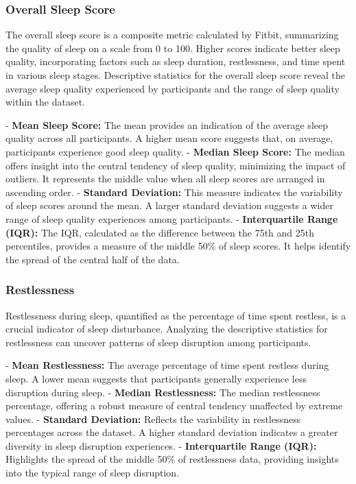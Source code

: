 \documentclass[10pt]{extarticle}
\begin{document}
\subsubsection{Overall Sleep Score}

The overall sleep score is a composite metric calculated by Fitbit, summarizing the quality of sleep on a scale from 0 to 100. Higher scores indicate better sleep quality, incorporating factors such as sleep duration, restlessness, and time spent in various sleep stages. Descriptive statistics for the overall sleep score reveal the average sleep quality experienced by participants and the range of sleep quality within the dataset.

- \textbf{Mean Sleep Score:} The mean provides an indication of the average sleep quality across all participants. A higher mean score suggests that, on average, participants experience good sleep quality.
- \textbf{Median Sleep Score:} The median offers insight into the central tendency of sleep quality, minimizing the impact of outliers. It represents the middle value when all sleep scores are arranged in ascending order.
- \textbf{Standard Deviation:} This measure indicates the variability of sleep scores around the mean. A larger standard deviation suggests a wider range of sleep quality experiences among participants.
- \textbf{Interquartile Range (IQR):} The IQR, calculated as the difference between the 75th and 25th percentiles, provides a measure of the middle 50\% of sleep scores. It helps identify the spread of the central half of the data.

\subsubsection{Restlessness}

Restlessness during sleep, quantified as the percentage of time spent restless, is a crucial indicator of sleep disturbance. Analyzing the descriptive statistics for restlessness can uncover patterns of sleep disruption among participants.

- \textbf{Mean Restlessness:} The average percentage of time spent restless during sleep. A lower mean suggests that participants generally experience less disruption during sleep.
- \textbf{Median Restlessness:} The median restlessness percentage, offering a robust measure of central tendency unaffected by extreme values.
- \textbf{Standard Deviation:} Reflects the variability in restlessness percentages across the dataset. A higher standard deviation indicates a greater diversity in sleep disruption experiences.
- \textbf{Interquartile Range (IQR):} Highlights the spread of the middle 50\% of restlessness data, providing insights into the typical range of sleep disruption.
\end{document}
